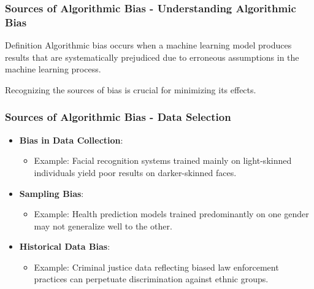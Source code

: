 \documentclass[aspectratio=169]{beamer}
\begin{document}
\begin{frame}[fragile]
    \frametitle{Sources of Algorithmic Bias - Understanding Algorithmic Bias}
    \begin{block}{Definition}
        Algorithmic bias occurs when a machine learning model produces results that are systematically prejudiced due to erroneous assumptions in the machine learning process.
    \end{block}
    Recognizing the sources of bias is crucial for minimizing its effects.
\end{frame}

\begin{frame}[fragile]
    \frametitle{Sources of Algorithmic Bias - Data Selection}
    \begin{itemize}
        \item \textbf{Bias in Data Collection}:
            \begin{itemize}
                \item Example: Facial recognition systems trained mainly on light-skinned individuals yield poor results on darker-skinned faces.
            \end{itemize}
        \item \textbf{Sampling Bias}:
            \begin{itemize}
                \item Example: Health prediction models trained predominantly on one gender may not generalize well to the other.
            \end{itemize}
        \item \textbf{Historical Data Bias}:
            \begin{itemize}
                \item Example: Criminal justice data reflecting biased law enforcement practices can perpetuate discrimination against ethnic groups.
            \end{itemize}
    \end{itemize}
\end{frame}
\end{document}

